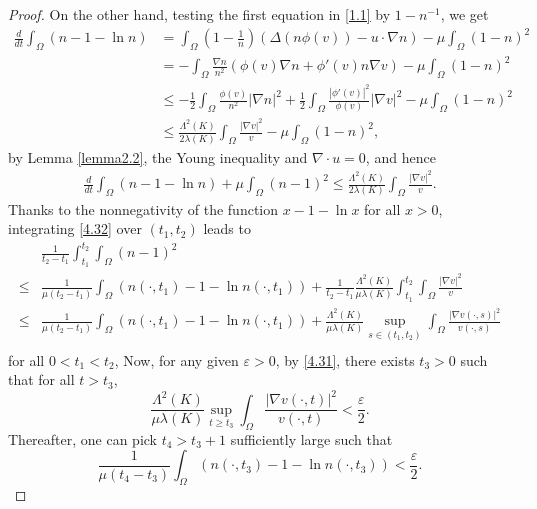 \documentclass[10pt,a4paper]{amsart}
\begin{document}
\begin{proof}[Proof]
On the other hand, testing the first equation in \eqref{1.1} by $1-n^{-1}$, we get
\begin{equation*}
\begin{split}
\frac d{dt}\int_\Omega(n-1-\ln n)
&=\int_\Omega (1-\frac 1 n)
(\Delta (n\phi(v))-u\cdot\nabla n)- \mu\int_\Omega(1- n)^2\\
&=-\int_\Omega\frac{\nabla n}{n^2}
(\phi(v) \nabla n+\phi'(v)n \nabla v )- \mu\int_\Omega(1- n)^2\\
&\leq -\frac12\int_\Omega \frac{\phi(v)} {n^2}|\nabla n|^2+ \frac12
\int_\Omega \frac{|\phi'(v)|^2} {\phi(v)} |\nabla v|^2- \mu\int_\Omega(1- n)^2\\
&\leq
\frac{\Lambda^2(K)}{2\lambda(K)}\int_\Omega \frac {|\nabla v|^2}v - \mu\int_\Omega(1- n)^2,
\end{split}
\end{equation*}
by Lemma \ref{lemma2.2}, the Young inequality and $\nabla\cdot u=0$,
and hence
\begin{equation}\label{4.32}
\begin{split}
\frac d{dt}\int_\Omega(n-1-\ln n)
+ \mu\int_\Omega(n-1)^2\leq
\frac{\Lambda^2(K)}{2\lambda(K)}\int_\Omega \frac {|\nabla v|^2}v.
\end{split}
\end{equation}
Thanks to the nonnegativity of the function $x-1-\ln x $ for all $x>0$,  integrating  \eqref{4.32} over $(t_1,t_2)$
leads to
\begin{equation}\label{4.33}
\begin{split}
&\frac{1}{t_2-t_1}\int^{t_2}_{t_1}\int_\Omega(n-1)^2\\
\leq &\frac{1}{\mu(t_2-t_1)} \int_\Omega(n(\cdot,t_1)-1-\ln n(\cdot,t_1))
+
\frac{1}{t_2-t_1}\frac{\Lambda^2(K)}{\mu\lambda(K)}\int^{t_2}_{t_1} \int_\Omega \frac {|\nabla v|^2}v
\\
\leq& \frac{1}{\mu(t_2-t_1)} \int_\Omega(n(\cdot,t_1)-1-\ln n(\cdot,t_1))
+
\frac{\Lambda^2(K)}{\mu\lambda(K)}\sup_{s\in (t_1,t_2)} \int_\Omega \frac {|\nabla v(\cdot,s)|^2}{v(\cdot,s)}\\
\end{split}
\end{equation}
for all $0<t_1<t_2$, Now, for any given $\varepsilon>0$, by \eqref{4.31}, there exists $t_3>0$ such that for all $t>t_3$,
$$\frac{\Lambda^2(K)}{\mu\lambda(K)}\sup_{t\geq t_3} \int_\Omega \frac {|\nabla v(\cdot,t)|^2}{v(\cdot,t)}< \frac \varepsilon 2.
$$
Thereafter, one can pick $t_4>t_3+1$ sufficiently large such that
$$\frac{1}{\mu(t_4-t_3)} \int_\Omega(n(\cdot,t_3)-1-\ln n(\cdot,t_3))< \frac \varepsilon 2.
$$
\end{proof}
\end{document}
